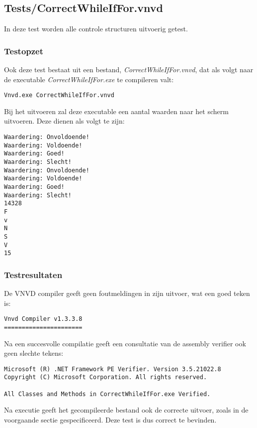 \subsection{Tests/CorrectWhileIfFor.vnvd}
In deze test worden alle controle structuren uitvoerig getest.

\subsubsection{Testopzet}
Ook deze test bestaat uit een bestand, \textit{CorrectWhileIfFor.vnvd}, dat als volgt naar de executable \textit{CorrectWhileIfFor.exe} te compileren valt:

\begin{lstlisting}
Vnvd.exe CorrectWhileIfFor.vnvd
\end{lstlisting}

Bij het uitvoeren zal deze executable een aantal waarden naar het scherm uitvoeren. Deze dienen als volgt te zijn:

\begin{lstlisting}
Waardering: Onvoldoende!
Waardering: Voldoende!
Waardering: Goed!
Waardering: Slecht!
Waardering: Onvoldoende!
Waardering: Voldoende!
Waardering: Goed!
Waardering: Slecht!
14328
F
v
N
S
V
15
\end{lstlisting}

\subsubsection{Testresultaten}
De VNVD compiler geeft geen foutmeldingen in zijn uitvoer, wat een goed teken is:

\begin{lstlisting}
Vnvd Compiler v1.3.3.8
======================

\end{lstlisting}

Na een succesvolle compilatie geeft een consultatie van de assembly verifier ook geen slechte tekens:

\begin{lstlisting}
Microsoft (R) .NET Framework PE Verifier. Version 3.5.21022.8
Copyright (C) Microsoft Corporation. All rights reserved.

All Classes and Methods in CorrectWhileIfFor.exe Verified.
\end{lstlisting}

Na executie geeft het gecompileerde bestand ook de correcte uitvoer, zoals in de voorgaande sectie gespecificeerd. Deze test is dus correct te bevinden.

